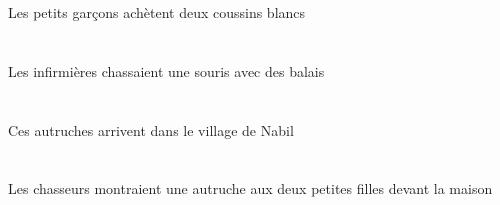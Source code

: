 \begin{exe}
 Les petits garçons achètent deux coussins blancs
\ex\glll
   \DEFPlErg{}   \infirmiereAPlErg{}    \INDPlObl{}   \balaiAPlObl{}   \AVEC{}   \INDSgAbs{}   \sourisBSgAbs{}  \chasserVtPstBSg{} \\
   \DEFPlErgP{}   \infirmiereAPlErgP{}    \INDPlOblP{}   \balaiAPlOblP{}   \AVECP{}   \INDSgAbsP{}   \sourisBSgAbsP{}  \chasserVtPstBSgP{} \\
   \DEFPlErgG{}   \infirmiereAPlErgG{}    \INDPlOblG{}   \balaiAPlOblG{}   \AVECG{}   \INDSgAbsG{}   \sourisBSgAbsG{}  \chasserVtPstBSgG{} \\
 Les infirmières chassaient une souris avec des balais
\ex\glll
   \DEMPlAbs{}   \autrucheBPlAbs{}    \DEFSgObl{}    \INDSgObl{}   \NabilDSgObl{}   \DE{}   \villageCSgObl{}   \DANS{}  \arriverViPrsBPl{} \\
   \DEMPlAbsP{}   \autrucheBPlAbsP{}    \DEFSgOblP{}    \INDSgOblP{}   \NabilDSgOblP{}   \DEP{}   \villageCSgOblP{}   \DANSP{}  \arriverViPrsBPlP{} \\
   \DEMPlAbsG{}   \autrucheBPlAbsG{}    \DEFSgOblG{}    \INDSgOblG{}   \NabilDSgOblG{}   \DEG{}   \villageCSgOblG{}   \DANSG{}  \arriverViPrsBPlG{} \\
 Ces autruches arrivent dans le village de Nabil
\ex\glll
    \DEFSgObl{}   \maisonDSgObl{}   \DEVANT{}   \DEFPlErg{}   \chasseurCPlErg{}    \DEFDuObl{}   \petitCDu{}   \filleCDuObl{}   \A{}   \INDSgAbs{}   \autrucheBSgAbs{}  \montrerVdPstBSg{} \\
    \DEFSgOblP{}   \maisonDSgOblP{}   \DEVANTP{}   \DEFPlErgP{}   \chasseurCPlErgP{}    \DEFDuOblP{}   \petitCDuP{}   \filleCDuOblP{}   \AP{}   \INDSgAbsP{}   \autrucheBSgAbsP{}  \montrerVdPstBSgP{} \\
    \DEFSgOblG{}   \maisonDSgOblG{}   \DEVANTG{}   \DEFPlErgG{}   \chasseurCPlErgG{}    \DEFDuOblG{}   \petitCDuG{}   \filleCDuOblG{}   \AG{}   \INDSgAbsG{}   \autrucheBSgAbsG{}  \montrerVdPstBSgG{} \\
 Les chasseurs montraient une autruche aux deux petites filles devant la maison
\ex\glll
   \INDPlAbs{}   \garconDPlAbs{}    \DEFDuObl{}   \petitBDu{}   \blancBDu{}   \chambreBDuObl{}   \DANS{}  \arriverViPrsDPl{} \\
   \INDPlAbsP{}   \garconDPlAbsP{}    \DEFDuOblP{}   \petitBDuP{}   \blancBDuP{}   \chambreBDuOblP{}   \DANSP{}  \arriverViPrsDPlP{} \\
   \INDPlAbsG{}   \garconDPlAbsG{}    \DEFDuOblG{}   \petitBDuG{}   \blancBDuG{}   \chambreBDuOblG{}   \DANSG{}  \arriverViPrsDPlG{} \\

\end{exe}
